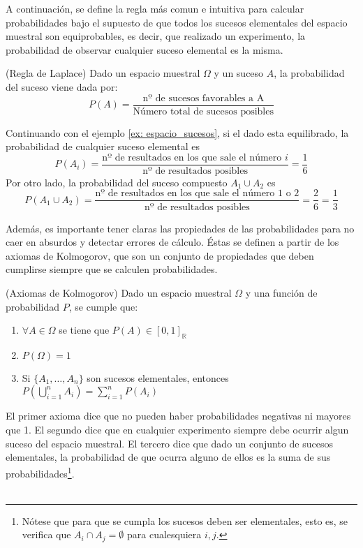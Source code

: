 A continuación, se define la regla más comun e intuitiva para calcular probabilidades bajo el supuesto de que todos los sucesos elementales del espacio muestral son equiprobables, es decir, que realizado un experimento, la probabilidad de observar cualquier suceso elemental es la misma.
\begin{definition}(Regla de Laplace)
Dado un espacio muestral $\Omega$ y un suceso $A$, la probabilidad del suceso viene dada por:
$$P(A) = \frac{\textrm{nº de sucesos favorables a A}}{\textrm{Número total de sucesos posibles}}$$	
\end{definition}
\begin{example}
Continuando con el ejemplo \ref{ex: espacio_sucesos}, si el dado esta equilibrado, la probabilidad de cualquier suceso elemental es
$$P(A_i) = \frac{\textrm{nº de resultados en los que sale el número } i}{\textrm{nº de resultados posibles}} = \frac{1}{6}$$
Por otro lado, la probabilidad del suceso compuesto $A_1 \cup A_2$ es
$$P(A_1 \cup A_2) = \frac{\textrm{nº de resultados en los que sale el número } 1 \textrm{ o } 2}{\textrm{nº de resultados posibles}} = \frac{2}{6}=\frac{1}{3}$$	
	\label{ex: probabilidad calculo}
\end{example}
Además, es importante tener claras las propiedades de las probabilidades para no caer en absurdos y detectar errores de cálculo. Éstas se definen a partir de los axiomas de Kolmogorov, que son un conjunto de propiedades que deben cumplirse siempre que se calculen probabilidades.
\begin{definition}(Axiomas de Kolmogorov)
Dado un espacio muestral $\Omega$ y una función de probabilidad $P$, se cumple que:
\begin{enumerate}
	\item $\forall A \in \Omega$ se tiene que $P(A) \in [0, 1]_{\mathbb{R}}$
	\item $P(\Omega) = 1$
	\item Si $\lbrace A_1,\ldots,A_n \rbrace$ son sucesos elementales, entonces $P(\bigcup_{i=1}^n{A_i}) = \sum_{i=1}^n{P(A_i)}$
\end{enumerate}
\end{definition}
El primer axioma dice que no pueden haber probabilidades negativas ni mayores que 1. El segundo dice que en cualquier experimento siempre debe ocurrir algun suceso del espacio muestral. El tercero dice que dado un conjunto de sucesos elementales, la probabilidad de que ocurra alguno de ellos es la suma de sus probabilidades\footnote{Nótese que para que se cumpla los sucesos deben ser elementales, esto es, se verifica que $A_i \cap A_j = \emptyset$ para cualesquiera $i, j$.}.\\\\
